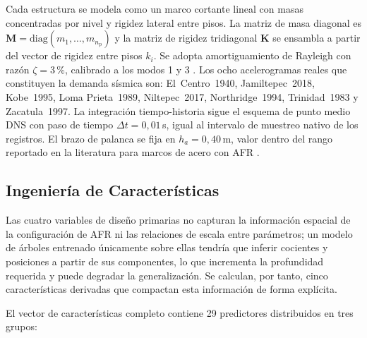 \documentclass[preprint,12pt,authoryear]{elsarticle}
\newcommand{\np}{n_{\mathrm{p}}}              %
\newcommand{\ha}{h_a}
\begin{document}
Cada estructura se modela como un marco cortante lineal con masas concentradas
por nivel y rigidez lateral entre pisos. La matriz de masa diagonal es
$\bm{M} = \mathrm{diag}(m_1,\ldots,m_{\np})$ y la matriz de rigidez tridiagonal
$\bm{K}$ se ensambla a partir del vector de rigidez entre pisos $k_i$.
Se adopta amortiguamiento de Rayleigh con razón $\zeta = 3\,\text{\%}$, calibrado a
los modos 1 y 3 \citep{chopra_dynamics_2015}. Los ocho acelerogramas reales que constituyen la demanda sísmica
son: El~Centro~1940, Jamiltepec~2018, Kobe~1995, Loma Prieta~1989, Niltepec~2017,
Northridge~1994, Trinidad~1983 y Zacatula~1997. La integración tiempo-historia sigue el esquema de punto medio DNS
\citep{Namorado2024} con paso de tiempo $\Delta t = 0{,}01$\,s, igual al
intervalo de muestreo nativo de los registros. El brazo de palanca se fija en
$\ha = 0{,}40$\,m, valor dentro del rango reportado en la literatura para
marcos de acero con AFR \citep{Mualla2002, Jarrahi2020jbe}.

\subsection{Ingeniería de Características}
\label{sec:method:features}

Las cuatro variables de diseño primarias no capturan la información espacial
de la configuración de AFR ni las relaciones de escala entre parámetros; un
modelo de árboles entrenado únicamente sobre ellas tendría que inferir cocientes
y posiciones a partir de sus componentes, lo que incrementa la profundidad
requerida y puede degradar la generalización. Se calculan, por tanto, cinco
características derivadas que compactan esta información de forma explícita.

El vector de características completo contiene 29 predictores distribuidos en
tres grupos:
\end{document}
